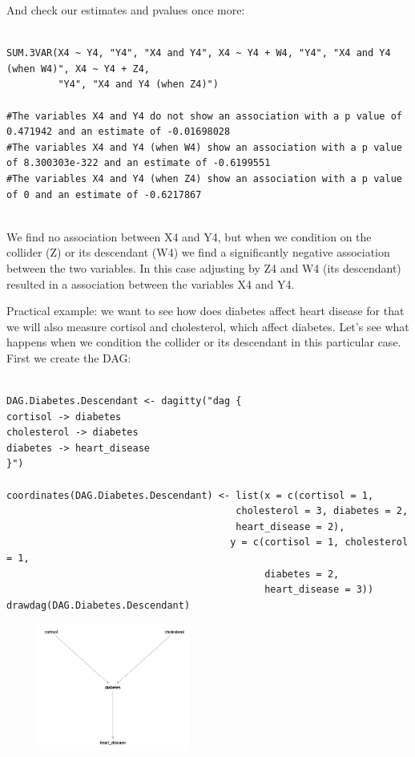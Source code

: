 \documentclass{article}
\begin{document}
And check our estimates and pvalues once more:

\begin{lstlisting}

SUM.3VAR(X4 ~ Y4, "Y4", "X4 and Y4", X4 ~ Y4 + W4, "Y4", "X4 and Y4 (when W4)", X4 ~ Y4 + Z4,
         "Y4", "X4 and Y4 (when Z4)")

#The variables X4 and Y4 do not show an association with a p value of 0.471942 and an estimate of -0.01698028 
#The variables X4 and Y4 (when W4) show an association with a p value of 8.300303e-322 and an estimate of -0.6199551 
#The variables X4 and Y4 (when Z4) show an association with a p value of 0 and an estimate of -0.6217867 


\end{lstlisting}

We find no association between X4 and Y4, but when we condition on the collider (Z) or its descendant (W4) we find a significantly negative association between the two variables. 
In this case adjusting by Z4 and W4 (its descendant) resulted in a association between the variables X4 and Y4. 



Practical example: we want to see how does diabetes affect heart disease for that we will also measure cortisol and cholesterol, which affect diabetes. Let's see what happens when we condition the collider or its descendant in this particular case. First we create the DAG:


\begin{lstlisting}

DAG.Diabetes.Descendant <- dagitty("dag {
cortisol -> diabetes
cholesterol -> diabetes
diabetes -> heart_disease
}")

coordinates(DAG.Diabetes.Descendant) <- list(x = c(cortisol = 1, 
                                        cholesterol = 3, diabetes = 2,
                                        heart_disease = 2),
                                       y = c(cortisol = 1, cholesterol = 1, 
                                             diabetes = 2,  
                                             heart_disease = 3))
drawdag(DAG.Diabetes.Descendant)

\end{lstlisting}


\begin{figure}[h]
\includegraphics[width=5cm]{DAG_DESCENDANT_DIAB.png}
\centering
\end{figure}
\end{document}
